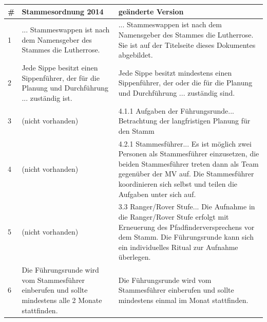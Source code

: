 \documentclass[a4paper]{article}
\begin{document}
\begin{table}[h]
\def\arraystretch{2}
\center
\begin{tabular}{ l|p{}|p{}}
\# & \textbf{Stammesordnung 2014}                                                                         & \textbf{geänderte Version}                                                                                                                                                                                                                 \\ \hline
1  & ... Stammeswappen ist nach dem Namensgeber des Stammes die Lutherrose.                               & ... Stammeswappen ist nach dem Namensgeber des Stammes die Lutherrose. Sie ist auf der Titelseite dieses Dokumentes abgebildet.                                                                                                               \\ \hline
2  & Jede Sippe besitzt einen Sippenführer, der für die Planung und Durchführung ... zuständig ist.       & Jede Sippe besitzt mindestens einen Sippenführer, der oder die für die Planung und Durchführung ... zuständig sind.                                                                                                                        \\ \hline
3  & (nicht vorhanden)                                                                                    & 4.1.1 Aufgaben der Führungsrunde... Betrachtung der langfristigen Planung für den Stamm                                                                                                                                                    \\ \hline
4  & (nicht vorhanden)                                                                                    & 4.2.1 Stammesführer... Es ist möglich zwei Personen als Stammesführer einzusetzen, die beiden Stammesführer treten dann als Team gegenüber der MV auf. Die Stammesführer koordinieren sich selbst und teilen die Aufgaben unter sich auf. \\ \hline
5  & (nicht vorhanden)                                                                                    & 3.3 Ranger/Rover Stufe... Die Aufnahme in die Ranger/Rover Stufe erfolgt mit Erneuerung des Pfadfinderversprechens vor dem Stamm. Die Führungsrunde kann sich ein individuelles Ritual zur Aufnahme überlegen.                                                                                                        \\ \hline
6  & Die Führungsrunde wird vom Stammesführer einberufen und sollte mindestens alle 2 Monate stattfinden. & Die Führungsrunde wird vom Stammesführer einberufen und sollte mindestens einmal im Monat stattfinden.                                                                                                                                    
\end{tabular}
\end{table}
\end{document}
